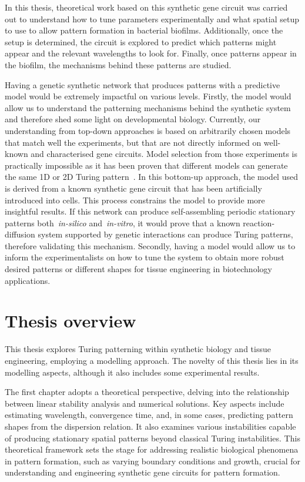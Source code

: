 In this thesis, theoretical work based on this synthetic gene circuit was carried out to understand how to tune parameters experimentally and what spatial setup to use to allow pattern formation in bacterial biofilms.
Additionally, once the setup is determined, the circuit is explored to predict which patterns might appear and the relevant wavelengths to look for.
Finally, once patterns appear in the biofilm, the mechanisms behind these patterns are studied. 

Having a genetic synthetic network that produces patterns with a predictive model would be extremely impactful on various levels.
Firstly, the model would allow us to understand the patterning mechanisms behind the synthetic system and therefore shed some light on developmental biology.
Currently, our understanding from top-down approaches is based on arbitrarily chosen models that match well the experiments, but that are not directly informed on well-known and characterised gene circuits.
Model selection from those experiments is practically impossible as it has been proven that different models can generate the same 1D or 2D Turing pattern~\parencite{Woolley2021}.
In this bottom-up approach, the model used is derived from a known synthetic gene circuit that has been artificially introduced into cells.
This process constrains the model to provide more insightful results.
If this network can produce self-assembling periodic stationary patterns both~\textit{in-silico} and~\textit{in-vitro}, it would prove that a known reaction-diffusion system supported by genetic interactions can produce Turing patterns, therefore validating this mechanism.
Secondly, having a model would allow us to inform the experimentalists on how to tune the system to obtain more robust desired patterns or different shapes for tissue engineering in biotechnology applications.


\section{Thesis overview}

This thesis explores Turing patterning within synthetic biology and tissue engineering, employing a modelling approach.
The novelty of this thesis lies in its modelling aspects, although it also includes some experimental results.

The first chapter adopts a theoretical perspective, delving into the relationship between linear stability analysis and numerical solutions.
Key aspects include estimating wavelength, convergence time, and, in some cases, predicting pattern shapes from the dispersion relation.
It also examines various instabilities capable of producing stationary spatial patterns beyond classical Turing instabilities.
This theoretical framework sets the stage for addressing realistic biological phenomena in pattern formation, such as varying boundary conditions and growth, crucial for understanding and engineering synthetic gene circuits for pattern formation.

